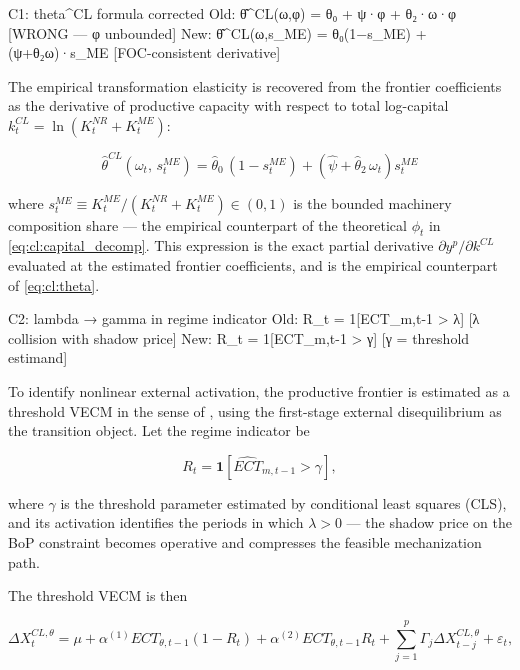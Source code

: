 \documentclass[11pt,a4paper]{article}
\begin{document}
{ C1: theta^CL formula corrected
 Old: θ̂^CL(ω,φ) = θ₀ + ψ·φ + θ₂·ω·φ  [WRONG — φ unbounded]
 New: θ̂^CL(ω,s_ME) = θ₀(1−s_ME) + (ψ+θ₂ω)·s_ME  [FOC-consistent derivative]

The empirical transformation elasticity is recovered from the frontier
coefficients as the derivative of productive capacity with respect to
total log-capital $k_t^{CL} = \ln(K_t^{NR}+K_t^{ME})$:

\begin{equation}
	\boxed{
		\hat{\theta}^{CL}(\omega_t,\, s_t^{ME})
		=
		\hat{\theta}_0\,(1-s_t^{ME})
		+
		\left(\hat{\psi} + \hat{\theta}_2\,\omega_t\right)s_t^{ME}
	}
	\label{eq:cl:theta_hat}
\end{equation}

where $s_t^{ME} \equiv K_t^{ME}/(K_t^{NR}+K_t^{ME}) \in (0,1)$ is the
bounded machinery composition share --- the empirical counterpart of
the theoretical $\phi_t$ in \eqref{eq:cl:capital_decomp}. This
expression is the exact partial derivative $\partial y^p/\partial k^{CL}$
evaluated at the estimated frontier coefficients, and is the empirical
counterpart of \eqref{eq:cl:theta}.

 C2: lambda → gamma in regime indicator
 Old: R_t = 1[ECT_m,t-1 > λ]  [λ collision with shadow price]
 New: R_t = 1[ECT_m,t-1 > γ]  [γ = threshold estimand]

To identify nonlinear external activation, the productive frontier is
estimated as a threshold VECM in the sense of \citet{Seo2006}, using
the first-stage external disequilibrium as the transition object. Let
the regime indicator be

\begin{equation}
	R_t
	=
	\mathbf{1}\!\left[\widehat{ECT}_{m,t-1} > \gamma\right],
	\label{eq:cl:regime_indicator}
\end{equation}

where $\gamma$ is the threshold parameter estimated by conditional
least squares (CLS), and its activation identifies the periods in which
$\lambda > 0$ --- the shadow price on the BoP constraint becomes
operative and compresses the feasible mechanization path.

The threshold VECM is then

\begin{equation}
	\Delta X_t^{CL,\theta}
	=
	\mu
	+
	\alpha^{(1)} ECT_{\theta,t-1}(1-R_t)
	+
	\alpha^{(2)} ECT_{\theta,t-1}R_t
	+
	\sum_{j=1}^{p}\Gamma_j \Delta X_{t-j}^{CL,\theta}
	+
	\varepsilon_t,
	\label{eq:cl:tvecm_theta}
\end{equation}

}
\end{document}
